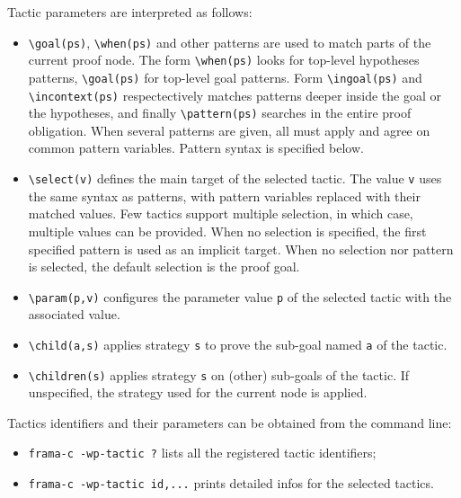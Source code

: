 Tactic parameters are interpreted as follows:
\begin{itemize}
\item \verb+\goal(ps)+, \verb+\when(ps)+ and other patterns are used to
  match parts of the current proof node. The form \verb+\when(ps)+ looks
  for top-level hypotheses patterns, \verb+\goal(ps)+ for top-level goal patterns.
  Form \verb+\ingoal(ps)+ and \verb+\incontext(ps)+ respectectively matches patterns
  deeper inside the goal or the hypotheses, and finally
  \verb+\pattern(ps)+ searches in the entire proof obligation.
  When several patterns are given, all must apply and agree on common pattern variables.
  Pattern syntax is specified below.
\item \verb+\select(v)+ defines the main target of the selected tactic. The
  value \verb+v+ uses the same syntax as patterns, with pattern variables
  replaced with their matched values. Few tactics support multiple selection,
  in which case, multiple values can be provided.
  When no selection is specified, the first
  specified pattern is used as an implicit target. When no selection nor pattern
  is selected, the default selection is the proof goal.
\item \verb+\param(p,v)+ configures the parameter value \verb+p+ of the selected
  tactic with the associated value.
\item \verb+\child(a,s)+ applies strategy \verb+s+ to prove the sub-goal named
  \verb+a+ of the tactic.
\item \verb+\children(s)+ applies strategy \verb+s+ on (other) sub-goals of the
  tactic. If unspecified, the strategy used for the current node is applied.
\end{itemize}

Tactics identifiers and their parameters can be obtained from the command line:
\begin{itemize}
\item \verb|frama-c -wp-tactic ?| lists all the registered tactic identifiers;
\item \verb|frama-c -wp-tactic id,...| prints detailed infos for the selected tactics.
\end{itemize}

